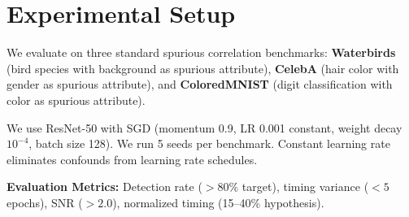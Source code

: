 \section{Experimental Setup}

We evaluate on three standard spurious correlation benchmarks: \textbf{Waterbirds} (bird species with background as spurious attribute), \textbf{CelebA} (hair color with gender as spurious attribute), and \textbf{ColoredMNIST} (digit classification with color as spurious attribute).

We use ResNet-50 with SGD (momentum 0.9, LR 0.001 constant, weight decay $10^{-4}$, batch size 128). We run 5 seeds per benchmark. Constant learning rate eliminates confounds from learning rate schedules.

\textbf{Evaluation Metrics:} Detection rate ($>80\%$ target), timing variance ($<5$ epochs), SNR ($>2.0$), normalized timing (15--40\% hypothesis).
